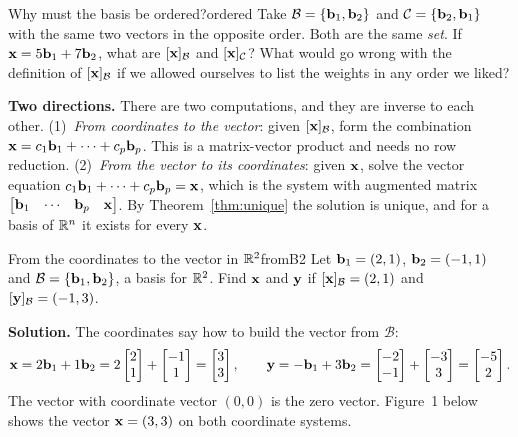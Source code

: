 \documentclass[11pt]{article}
\begin{document}
\begin{think}{Why must the basis be ordered?}{ordered}
Take $\mathcal{B}=\{\mathbf{b}_1,\mathbf{b}_2\}$ and $\mathcal{C}=\{\mathbf{b}_2,\mathbf{b}_1\}$ with the same two vectors in the opposite order. Both are the same \emph{set}. If $\mathbf{x}=5\mathbf{b}_1+7\mathbf{b}_2$, what are $[\mathbf{x}]_{\mathcal{B}}$ and $[\mathbf{x}]_{\mathcal{C}}$? What would go wrong with the definition of $[\mathbf{x}]_{\mathcal{B}}$ if we allowed ourselves to list the weights in any order we liked?
\end{think}

\textbf{Two directions.} There are two computations, and they are inverse to each other. (1)~\emph{From coordinates to the vector}: given $[\mathbf{x}]_{\mathcal{B}}$, form the combination $\mathbf{x}=c_1\mathbf{b}_1+\cdots+c_p\mathbf{b}_p$. This is a matrix-vector product and needs no row reduction. (2)~\emph{From the vector to its coordinates}: given $\mathbf{x}$, solve the vector equation $c_1\mathbf{b}_1+\cdots+c_p\mathbf{b}_p=\mathbf{x}$, which is the system with augmented matrix $\begin{bmatrix}\mathbf{b}_1&\cdots&\mathbf{b}_p&\mathbf{x}\end{bmatrix}$. By Theorem~\ref{thm:unique} the solution is unique, and for a basis of $\mathbb{R}^n$ it exists for every $\mathbf{x}$.

\begin{exmp}{From the coordinates to the vector in $\mathbb{R}^2$}{fromB2}
Let $\mathbf{b}_1=(2,1)$, $\mathbf{b}_2=(-1,1)$ and $\mathcal{B}=\{\mathbf{b}_1,\mathbf{b}_2\}$, a basis for $\mathbb{R}^2$. Find $\mathbf{x}$ and $\mathbf{y}$ if $[\mathbf{x}]_{\mathcal{B}}=(2,1)$ and $[\mathbf{y}]_{\mathcal{B}}=(-1,3)$.

\textbf{Solution.} The coordinates say how to build the vector from $\mathcal{B}$:
\[
\mathbf{x}=2\mathbf{b}_1+1\mathbf{b}_2=2\begin{bmatrix}2\\1\end{bmatrix}+\begin{bmatrix}-1\\1\end{bmatrix}=\begin{bmatrix}3\\3\end{bmatrix},\qquad
\mathbf{y}=-\mathbf{b}_1+3\mathbf{b}_2=\begin{bmatrix}-2\\-1\end{bmatrix}+\begin{bmatrix}-3\\3\end{bmatrix}=\begin{bmatrix}-5\\2\end{bmatrix}.
\]
The vector with coordinate vector $(0,0)$ is the zero vector. Figure~1 below shows the vector $\mathbf{x}=(3,3)$ on both coordinate systems.
\end{exmp}
\end{document}
